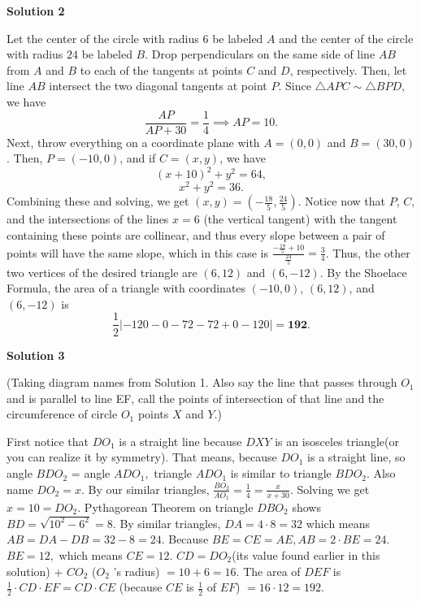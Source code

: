 \begin{enumerate}
 



\textbf{Solution 2}

Let the center of the circle with radius $6$ be labeled $A$ and the center of the circle with radius $24$ be labeled $B$. Drop perpendiculars on the same side of line $AB$ from $A$ and $B$ to each of the tangents at points $C$ and $D$, respectively. Then, let line $AB$ intersect the two diagonal tangents at point $P$. Since $\triangle{APC} \sim \triangle{BPD}$, we have 
 \[\frac{AP}{AP+30}=\frac14 \implies AP=10.\] Next, throw everything on a coordinate plane with $A=(0, 0)$ and $B = (30, 0)$. Then, $P = (-10, 0)$, and if $C = (x, y)$, we have 
 \[(x+10)^2+y^2=64,\] 
 \[x^2+y^2=36.\] Combining these and solving, we get $(x, y)=\left(-\frac{18}5, \frac{24}5\right)$. Notice now that $P$, $C$, and the intersections of the lines $x=6$ (the vertical tangent) with the tangent containing these points are collinear, and thus every slope between a pair of points will have the same slope, which in this case is $\frac{-\frac{18}5+10}{\frac{24}5}=\frac34$. Thus, the other two vertices of the desired triangle are $(6, 12)$ and $(6, -12)$. By the Shoelace Formula, the area of a triangle with coordinates $(-10, 0)$, $(6, 12)$, and $(6, -12)$ is 
 \[\frac12|-120-0-72-72+0-120|=\boxed{\textbf{192}}.\]




\textbf{Solution 3}

(Taking diagram names from Solution 1. Also say the line that passes through $O_1$ and is parallel to line EF, call the points of intersection of that line and the circumference of circle $O_1$ points $X$ and $Y$.)

 First notice that $DO_1$ is a straight line because $DXY$ is an isosceles triangle(or you can realize it by symmetry). That means, because $DO_1$ is a straight line, so angle $BDO_2$ = angle $ADO_1,$ triangle $ADO_1$ is similar to triangle $BDO_2$. Also name $DO_2 = x$. By our similar triangles, $\frac{BO_2}{AO_1} = \frac{1}{4} = \frac{x}{x+30}$. Solving we get $x = 10 = DO_2$. Pythagorean Theorem on triangle $DBO_2$ shows $BD = \sqrt{10^2 - 6^2} = 8$. By similar triangles, $DA = 4 \cdot 8 = 32$ which means $AB = DA - DB = 32 - 8 = 24$. Because $BE = CE = AE, AB = 2 \cdot BE = 24$. $BE = 12,$ which means $CE = 12$. $CD = DO_2$(its value found earlier in this solution) + $CO_2$ ($O_2$ 's radius) $= 10 + 6 = 16$. The area of $DEF$ is $\frac{1}{2} \cdot CD \cdot EF = CD \cdot CE$ (because $CE$ is $\frac{1}{2}$ of $EF$) $= 16 \cdot 12 = 192$.


\end{enumerate}
